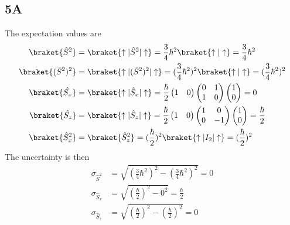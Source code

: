 \subsection*{5A}
The expectation values are
\begin{equation}
    \begin{split}
        \braket{\hat{S}^2} &= \braket{\uparrow|\hat{S}^2|\uparrow} = \frac{3}{4}\hbar^2 \braket{\uparrow|\uparrow} = \frac{3}{4}\hbar^2\\
        \braket{(\hat{S}^2)^2} &= \braket{\uparrow|(\hat{S}^2)^2|\uparrow} = (\frac{3}{4}\hbar^2)^2 \braket{\uparrow|\uparrow} = (\frac{3}{4}\hbar^2)^2\\
        \braket{\hat{S_x}} &= \braket{\uparrow | \hat{S}_x|\uparrow} = \frac{\hbar}{2}\begin{pmatrix}
            1 & 0
        \end{pmatrix}
        \begin{pmatrix}
            0 & 1\\
            1 & 0
        \end{pmatrix}
        \begin{pmatrix}
            1\\0
        \end{pmatrix} = 0\\
        \braket{\hat{S_z}} &= \braket{\uparrow | \hat{S}_z|\uparrow} = \frac{\hbar}{2}\begin{pmatrix}
            1 & 0
        \end{pmatrix}
        \begin{pmatrix}
            1 & 0\\
            0 & -1
        \end{pmatrix}
        \begin{pmatrix}
            1\\0
        \end{pmatrix} = \frac{\hbar}{2}\\
        \braket{\hat{S}_x^2} &= \braket{\hat{S}_z^2} = (\frac{\hbar}{2})^2\braket{\uparrow|I_2|\uparrow} = (\frac{\hbar}{2})^2
    \end{split}
\end{equation}
The uncertainty is then
\begin{equation}
    \begin{split}
        \sigma_{\hat{S}^2} &= \sqrt{(\frac{3}{4}\hbar^2)^2-(\frac{3}{4}\hbar^2)^2}=0\\
        \sigma_{\hat{S}_x} &= \sqrt{(\frac{\hbar}{2})^2-0^2}=\frac{\hbar}{2}\\
        \sigma_{\hat{S}_z} &= \sqrt{(\frac{\hbar}{2})^2-(\frac{\hbar}{2})^2} = 0
    \end{split}
\end{equation}

